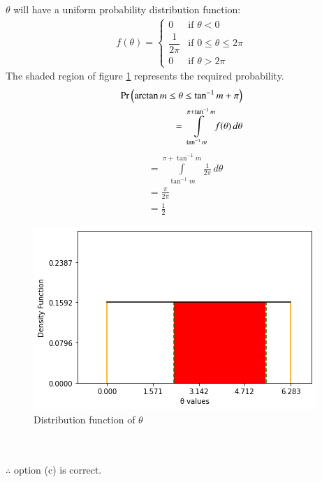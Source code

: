 $\theta$ will have a uniform probability distribution function: 
\begin{align}
    f(\theta)=\nonumber
    \begin{cases}
    0 &\text{if } \theta<0\\
    \dfrac{1}{2\pi} & \text{if } 0\leq\theta\leq2\pi\\
    0 &\text{if } \theta>2\pi
    \end{cases}
\end{align}
The shaded region of figure \ref{ma2001-2.23:fig:my_label} represents the required probability. 
\begin{align}
    \Pr\left(\arctan m\leq\theta\leq\tan^{-1} m +\pi\right)\nonumber\\
    =\displaystyle\int\limits_{\tan^{-1} m}^{\pi + \tan^{-1} m} f(\theta) \,d\theta
\end{align}
\begin{align}
    &=\displaystyle\int\limits_{\tan^{-1} m}^{\pi + \tan^{-1} m} \frac{1}{2\pi} \,d\theta\\
    &=\frac{\pi}{2\pi}\\
    &=\frac{1}{2}
\end{align}
\begin{figure}[h!]
    \centering
    \includegraphics[width=\columnwidth]{solutions/ma/2001/2.23/figures/distribution_2.png}
    \caption{Distribution function of $\theta$}
    \label{ma2001-2.23:fig:my_label}
\end{figure}\\
\\ $\therefore$ option (c) is correct.


